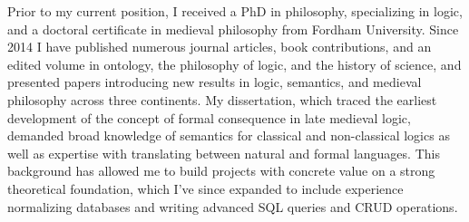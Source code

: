 Prior to my current position, I received a PhD in philosophy, specializing in logic, and a doctoral certificate in medieval philosophy
from Fordham University. 
Since 2014 I have published 
numerous journal articles, book contributions, and an edited volume 
in 
ontology, 
the philosophy of logic, 
and the history of science, 
and presented papers introducing new results in logic, semantics, and medieval philosophy across three continents.
My dissertation, which traced the earliest development of the concept of formal consequence
in late medieval logic, demanded 
broad knowledge 
of semantics for classical and non-classical logics 
as well as  
expertise with translating between natural and formal languages.  
This background has allowed me to build projects with concrete value on a strong theoretical foundation, 
which I've since expanded to include experience normalizing databases and writing advanced SQL queries and CRUD operations. 